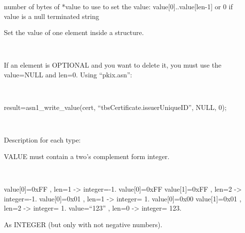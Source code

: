 \documentclass[]{article}
\begin{document}
\begin{description}
\itemsep1pt\parskip0pt
\item[int len]
number of bytes of *value to use to set the value:
value{[}0{]}..value{[}len-1{]} or 0 if value is a null terminated string
\end{description}


Set the value of one element inside a structure.

~

If an element is OPTIONAL and you want to delete it, you must use the
value=NULL and len=0. Using ``pkix.asn'':

~

result=asn1\_write\_value(cert, ``tbsCertificate.issuerUniqueID'', NULL,
0);

~

Description for each type:


VALUE must contain a two's complement form integer.

~

value{[}0{]}=0xFF , len=1 -\textgreater{} integer=-1. value{[}0{]}=0xFF
value{[}1{]}=0xFF , len=2 -\textgreater{} integer=-1. value{[}0{]}=0x01
, len=1 -\textgreater{} integer= 1. value{[}0{]}=0x00 value{[}1{]}=0x01
, len=2 -\textgreater{} integer= 1. value=``123'' , len=0
-\textgreater{} integer= 123.


As INTEGER (but only with not negative numbers).

\end{document}
